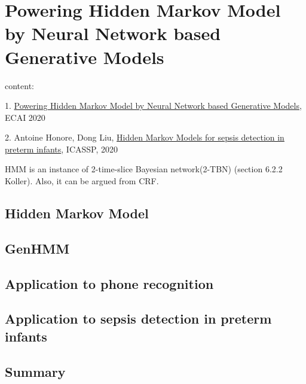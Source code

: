 \chapter{Powering Hidden Markov Model by Neural Network based Generative Models}
content:

1. \href{https://arxiv.org/abs/1910.05744}{Powering Hidden Markov Model by Neural Network based Generative Models}, ECAI 2020

2. Antoine Honore, Dong Liu, \href{https://arxiv.org/pdf/1910.13904.pdf}{Hidden Markov Models for sepsis detection in preterm infants}, ICASSP, 2020

HMM is an instance of 2-time-slice Bayesian network(2-TBN) (section 6.2.2 Koller). Also, it can be argued from CRF.
\section{Hidden Markov Model}

\section{GenHMM}

\section{Application to phone recognition}

\section{Application to sepsis detection in preterm infants}

\section{Summary}

